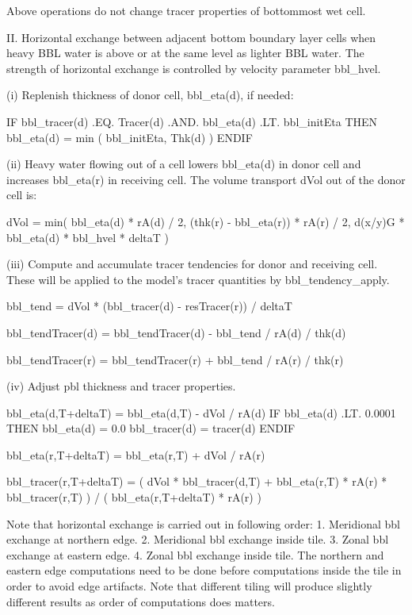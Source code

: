 Above operations do not change tracer properties of bottommost wet cell.

II. Horizontal exchange between adjacent bottom boundary layer cells when
heavy BBL water is above or at the same level as lighter BBL water.  The
strength of horizontal exchange is controlled by velocity parameter bbl_hvel.

(i) Replenish thickness of donor cell, bbl_eta(d), if needed:

    IF bbl_tracer(d) .EQ. Tracer(d) .AND. bbl_eta(d) .LT. bbl_initEta THEN
       bbl_eta(d) = min ( bbl_initEta, Thk(d) )
    ENDIF

(ii) Heavy water flowing out of a cell lowers bbl_eta(d) in donor cell and
increases bbl_eta(r) in receiving cell.  The volume transport dVol out
of the donor cell is:

    dVol = min( bbl_eta(d) * rA(d) / 2,
                (thk(r) - bbl_eta(r)) * rA(r) / 2,
                d(x/y)G * bbl_eta(d) * bbl_hvel * deltaT )

(iii) Compute and accumulate tracer tendencies for donor and receiving cell.
These will be applied to the model's tracer quantities by bbl_tendency_apply.

    bbl_tend = dVol * (bbl_tracer(d) - resTracer(r)) / deltaT

    bbl_tendTracer(d) = bbl_tendTracer(d) - bbl_tend / rA(d) / thk(d)

    bbl_tendTracer(r) = bbl_tendTracer(r) + bbl_tend / rA(r) / thk(r)

(iv) Adjust pbl thickness and tracer properties.
                        
    bbl_eta(d,T+deltaT) = bbl_eta(d,T) - dVol / rA(d)
    IF bbl_eta(d) .LT. 0.0001 THEN
       bbl_eta(d) = 0.0
       bbl_tracer(d) = tracer(d)
    ENDIF

    bbl_eta(r,T+deltaT) = bbl_eta(r,T) + dVol / rA(r)

    bbl_tracer(r,T+deltaT) = ( dVol * bbl_tracer(d,T) +
                              bbl_eta(r,T) * rA(r) * bbl_tracer(r,T) ) /
                            ( bbl_eta(r,T+deltaT) * rA(r) )

Note that horizontal exchange is carried out in following order:
1. Meridional bbl exchange at northern edge.
2. Meridional bbl exchange inside tile.
3. Zonal bbl exchange at eastern edge.
4. Zonal bbl exchange inside tile.
The northern and eastern edge computations need to be done before
computations inside the tile in order to avoid edge artifacts.
Note that different tiling will produce slightly different results
as order of computations does matters.
